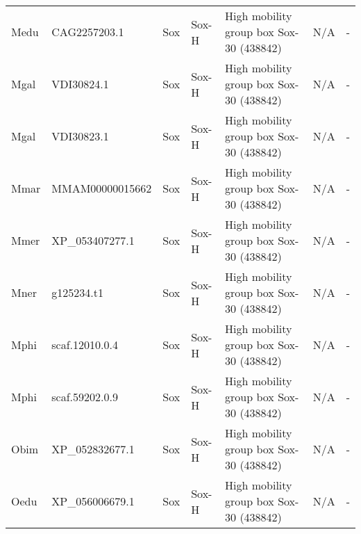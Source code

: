 \documentclass[../main.tex]{subfiles}
\begin{document}
\begin{landscape}
\begin{longtable}{lllllll}
		Medu           & CAG2257203.1          & Sox            & Sox-H               & High mobility group box Sox-30 (438842)     & N/A                                                                    & -                    \\
		Mgal           & VDI30824.1            & Sox            & Sox-H               & High mobility group box Sox-30 (438842)     & N/A                                                                    & -                    \\
		Mgal           & VDI30823.1            & Sox            & Sox-H               & High mobility group box Sox-30 (438842)     & N/A                                                                    & -                    \\
		Mmar           & MMAM00000015662       & Sox            & Sox-H               & High mobility group box Sox-30 (438842)     & N/A                                                                    & -                    \\
		Mmer           & XP\_053407277.1       & Sox            & Sox-H               & High mobility group box Sox-30 (438842)     & N/A                                                                    & -                    \\
		Mner           & g125234.t1            & Sox            & Sox-H               & High mobility group box Sox-30 (438842)     & N/A                                                                    & -                    \\
		Mphi           & scaf.12010.0.4        & Sox            & Sox-H               & High mobility group box Sox-30 (438842)     & N/A                                                                    & -                    \\
		Mphi           & scaf.59202.0.9        & Sox            & Sox-H               & High mobility group box Sox-30 (438842)     & N/A                                                                    & -                    \\
		Obim           & XP\_052832677.1       & Sox            & Sox-H               & High mobility group box Sox-30 (438842)     & N/A                                                                    & -                    \\
		Oedu           & XP\_056006679.1       & Sox            & Sox-H               & High mobility group box Sox-30 (438842)     & N/A                                                                    & -                    \\

\end{longtable}
\end{landscape}
\end{document}

